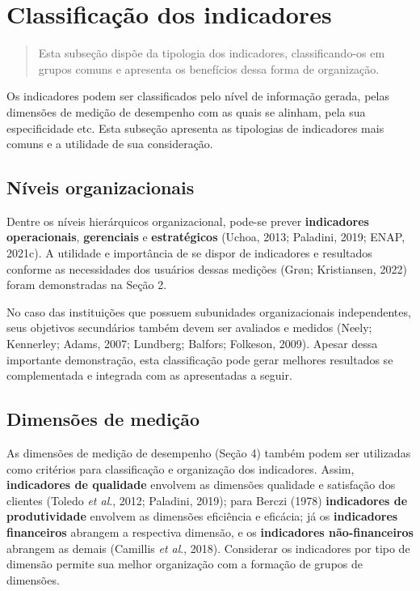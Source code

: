 \documentclass[
  letterpaper,
  DIV=11,
  numbers=noendperiod]{scrreprt}
\begin{document}
\hypertarget{classificauxe7uxe3o-dos-indicadores}{%
\chapter{Classificação dos
indicadores}\label{classificauxe7uxe3o-dos-indicadores}}

\begin{quote}
Esta subseção dispõe da tipologia dos indicadores, classificando-os em
grupos comuns e apresenta os benefícios dessa forma de organização.
\end{quote}

Os indicadores podem ser classificados pelo nível de informação gerada,
pelas dimensões de medição de desempenho com as quais se alinham, pela
sua especificidade etc. Esta subseção apresenta as tipologias de
indicadores mais comuns e a utilidade de sua consideração.

\hypertarget{nuxedveis-organizacionais}{%
\section{Níveis organizacionais}\label{nuxedveis-organizacionais}}

Dentre os níveis hierárquicos organizacional, pode-se prever
\textbf{indicadores operacionais}, \textbf{gerenciais} e
\textbf{estratégicos} (Uchoa, 2013; Paladini, 2019; ENAP, 2021c). A
utilidade e importância de se dispor de indicadores e resultados
conforme as necessidades dos usuários dessas medições (Grøn;
Kristiansen, 2022) foram demonstradas na Seção 2.

No caso das instituições que possuem subunidades organizacionais
independentes, seus objetivos secundários também devem ser avaliados e
medidos (Neely; Kennerley; Adams, 2007; Lundberg; Balfors; Folkeson,
2009). Apesar dessa importante demonstração, esta classificação pode
gerar melhores resultados se complementada e integrada com as
apresentadas a seguir.

\hypertarget{dimensuxf5es-de-mediuxe7uxe3o}{%
\section{Dimensões de medição}\label{dimensuxf5es-de-mediuxe7uxe3o}}

As dimensões de medição de desempenho (Seção 4) também podem ser
utilizadas como critérios para classificação e organização dos
indicadores. Assim, \textbf{indicadores de qualidade} envolvem as
dimensões qualidade e satisfação dos clientes (Toledo \emph{et al}.,
2012; Paladini, 2019); para Berczi (1978) \textbf{indicadores de
produtividade} envolvem as dimensões eficiência e eficácia; já os
\textbf{indicadores financeiros} abrangem a respectiva dimensão, e os
\textbf{indicadores não-financeiros} abrangem as demais (Camillis
\emph{et al}., 2018). Considerar os indicadores por tipo de dimensão
permite sua melhor organização com a formação de grupos de dimensões.
\end{document}
